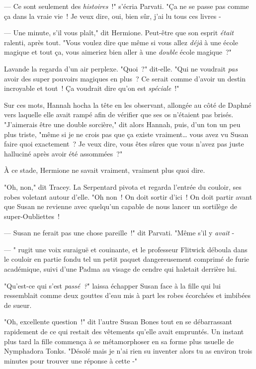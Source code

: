 --- Ce sont seulement des \emph{histoires}~!" s'écria Parvati. "Ça ne se passe pas comme ça dans la vraie vie~! Je veux dire, oui, bien sûr, j'ai lu tous ces livres -

--- Une minute, s'il vous plaît," dit Hermione. Peut-être que son esprit \emph{était} ralenti, après tout. "Vous voulez dire que même si vous allez \emph{déjà} à une école magique et tout ça, vous aimeriez bien aller à une \emph{double} école magique~?"

Lavande la regarda d'un air perplexe. "Quoi~?" dit-elle. "Qui ne voudrait \emph{pas} avoir des super pouvoirs magiques en plus~? Ce serait comme d'avoir un destin incroyable et tout~! Ça voudrait dire qu'on est \emph{spéciale}~!"

Sur ces mots, Hannah hocha la tête en les observant, allongée au côté de Daphné vers laquelle elle avait rampé afin de vérifier que ses os n'étaient pas brisés. "J'aimerais être une double sorcière," dit alors Hannah, puis, d'un ton un peu plus triste, "même si je ne crois pas que ça existe vraiment… vous avez vu Susan faire quoi exactement~? Je veux dire, vous êtes sûres que vous n'avez pas juste halluciné après avoir été assommées~?"

À ce stade, Hermione ne savait vraiment, vraiment plus quoi dire.

"Oh, non," dit Tracey. La Serpentard pivota et regarda l'entrée du couloir, ses robes voletant autour d'elle. "Oh non~! On doit sortir d'ici~! On doit partir avant que Susan ne revienne avec quelqu'un capable de nous lancer un sortilège de super-Oubliettes~!

--- Susan ne ferait pas une chose pareille~!" dit Parvati. "Même s'il y \emph{avait} -

--- " rugit une voix suraiguë et couinante, et le professeur Flitwick déboula dans le couloir en partie fondu tel un petit paquet dangereusement comprimé de furie académique, suivi d'une Padma au visage de cendre qui haletait derrière lui.

\later

"Qu'est-ce qui s'est \emph{passé~?}" laissa échapper Susan face à la fille qui lui ressemblait comme deux gouttes d'eau mis à part les robes écorchées et imbibées de sueur.

"Oh, excellente question~!" dit l'autre Susan Bones tout en se débarrassant rapidement de ce qui restait des vêtements qu'elle avait empruntés. Un instant plus tard la fille commença à se métamorphoser en sa forme plus usuelle de Nymphadora Tonks. "Désolé mais je n'ai rien su inventer alors tu as environ trois minutes pour trouver une réponse à cette -"

